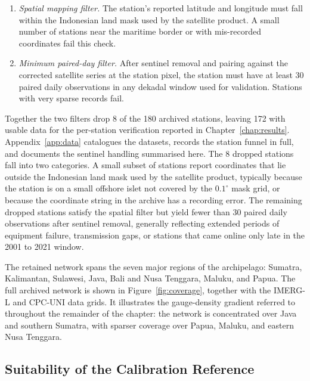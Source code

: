 \begin{enumerate}
    \item \textit{Spatial mapping filter.} The station's reported
    latitude and longitude must fall within the Indonesian land
    mask used by the satellite product. A small number of
    stations near the maritime border or with mis-recorded
    coordinates fail this check.
    \item \textit{Minimum paired-day filter.} After sentinel
    removal and pairing against the corrected satellite series at
    the station pixel, the station must have at least 30 paired
    daily observations in any dekadal window used for validation.
    Stations with very sparse records fail.
\end{enumerate}

Together the two filters drop 8 of the 180 archived stations,
leaving 172 with usable data for the per-station verification
reported in Chapter~\ref{chap:results}.
Appendix~\ref{app:data} catalogues the datasets, records the
station funnel in full, and documents the sentinel handling
summarised here. The 8 dropped stations
fall into two categories. A small subset of stations report
coordinates that lie outside the Indonesian land mask used by
the satellite product, typically because the station is on a
small offshore islet not covered by the $0.1^{\circ}$ mask grid,
or because the coordinate string in the archive has a recording
error. The remaining dropped stations satisfy the spatial filter
but yield fewer than 30 paired daily observations after sentinel
removal, generally reflecting extended periods of equipment
failure, transmission gaps, or stations that came online only
late in the 2001 to 2021 window.

The retained network spans the
seven major regions of the archipelago: Sumatra, Kalimantan,
Sulawesi, Java, Bali and Nusa Tenggara, Maluku, and Papua. The
full archived network is shown in Figure~\ref{fig:coverage},
together with the IMERG-L and CPC-UNI data grids. It illustrates
the gauge-density gradient referred to
throughout the remainder of the chapter: the network is
concentrated over Java and southern Sumatra, with sparser
coverage over Papua, Maluku, and eastern Nusa Tenggara.

\subsection{Suitability of the Calibration Reference}\label{sec:methods-reference-quality}

